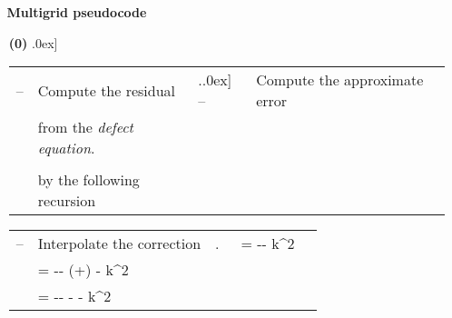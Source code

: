 \documentclass[mathpazo]{cicp}
\theoremstyle{definition}
\numberwithin{equation}{section}
\begin{document}
\begin{algorithm}
\caption{\bf ~~ Multigrid pseudocode}
\label{alg:mg}
\begin{enumerate} \sf 
\item[\bf (0)]  \1.0ex]
\begin{tabular}{lll}
-- &   Compute the residual  &  \enspace.\1.0ex]
-- &   Compute the approximate error \\
   &    from the \textit{defect equation}. & \\
   &   & \\	
   &	by the following recursion& \\
\end{tabular}

\hspace*{5ex}
\vspace*{2mm}

\begin{tabular}{lll}
-- & \sf  Interpolate the correction \hspace*{8ex} 
      & \enspace.\
  &= -\Delta - k^2 & \text{MP1} \\
  &= -\Delta - \nu(+) - k^2 & \\
 \mathcal{Z} &= -\Delta -\frac{1}{x} - \frac{1}{y} - k^2 & \text{MP3}


\end{tabular}
\end{enumerate}
\end{algorithm}
\end{document}
